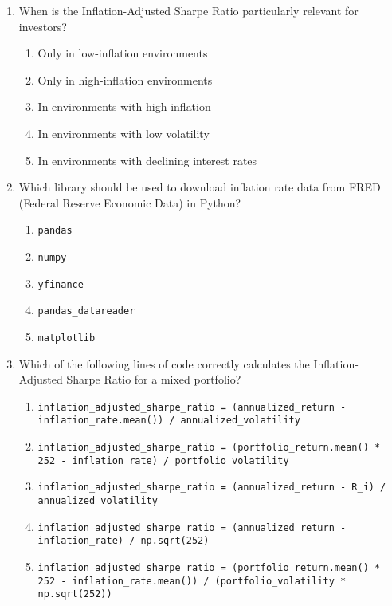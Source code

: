 \documentclass{article}
\begin{document}
\begin{enumerate}
    \item When is the Inflation-Adjusted Sharpe Ratio particularly relevant for investors?
    \begin{enumerate}
        \item Only in low-inflation environments
        \item Only in high-inflation environments
        \item In environments with high inflation
        \item In environments with low volatility
        \item In environments with declining interest rates
    \end{enumerate}

    \item Which library should be used to download inflation rate data from FRED (Federal Reserve Economic Data) in Python?
    \begin{enumerate}
        \item \texttt{pandas}
        \item \texttt{numpy}
        \item \texttt{yfinance}
        \item \texttt{pandas\_datareader}
        \item \texttt{matplotlib}
    \end{enumerate}

    \item Which of the following lines of code correctly calculates the Inflation-Adjusted Sharpe Ratio for a mixed portfolio?
    \begin{enumerate}
        \item \texttt{inflation\_adjusted\_sharpe\_ratio = (annualized\_return - inflation\_rate.mean()) / annualized\_volatility}
        \item \texttt{inflation\_adjusted\_sharpe\_ratio = (portfolio\_return.mean() * 252 - inflation\_rate) / portfolio\_volatility}
        \item \texttt{inflation\_adjusted\_sharpe\_ratio = (annualized\_return - R\_i) / annualized\_volatility}
        \item \texttt{inflation\_adjusted\_sharpe\_ratio = (annualized\_return - inflation\_rate) / np.sqrt(252)}
        \item \texttt{inflation\_adjusted\_sharpe\_ratio = (portfolio\_return.mean() * 252 - inflation\_rate.mean()) / (portfolio\_volatility * np.sqrt(252))}
    \end{enumerate}

\end{enumerate}
\end{document}
